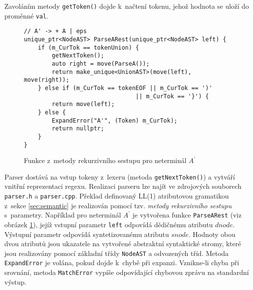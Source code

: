 \documentclass[thesis=B,czech]{FITthesis}[2019/12/23]
\theoremstyle{definition}
\begin{document}
Zavoláním metody \texttt{getToken()} dojde k~načtení tokenu, jehož hodnota se uloží do proměnné \texttt{val}. 

\begin{figure}[ht]
	\begin{verbatim}
// A' -> + A | eps
unique_ptr<NodeAST> ParseARest(unique_ptr<NodeAST> left) {
    if (m_CurTok == tokenUnion) {
        getNextToken();
        auto right = move(ParseA());
        return make_unique<UnionAST>(move(left), move(right));
    } else if (m_CurTok == tokenEOF || m_CurTok == ')' 
								|| m_CurTok == '}') {
        return move(left);
    } else {
        ExpandError("A'", (Token) m_CurTok);
        return nullptr;
    }
}
	\end{verbatim}
	\caption{Funkce z~metody rekurzivního sestupu pro neterminál $A^\prime$}\label{source:parser}
\end{figure}

Parser dostává na vstup tokeny z~lexeru (metoda \texttt{getNextToken()}) a vytváří vnitřní reprezentaci regexu. Realizaci parseru lze najít ve zdrojových souborech \texttt{parser.h} a \texttt{parser.cpp}. Překlad definovaný LL(1) atributovou gramatikou z~sekce \ref{sec:semantic} je realizován pomocí tzv. \emph{metody rekurzivního sestupu} s~parametry. Například pro neterminál $A^\prime$ je vytvořena funkce \texttt{ParseARest} (viz obrázek \ref{source:parser}), jejíž vstupní parametr \texttt{left} odpovídá dědičnému atributu $dnode$. Výstupní parametr odpovídá syntetizovanému atributu $snode$. Hodnoty obou dvou atributů jsou ukazatele na vytvořené abstraktní syntaktické stromy, které jsou realizovány pomocí základní třídy \texttt{NodeAST} a odvozených tříd. Metoda \texttt{ExpandError} je volána, pokud dojde k~chybě při expanzi. Vznikne-li chyba při srovnání, metoda \texttt{MatchError} vypíše odpovídající chybovou zprávu na standardní výstup.   
\end{document}

